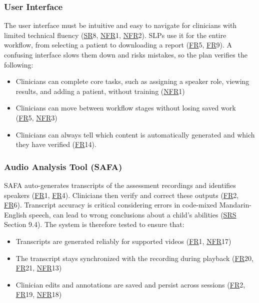 \documentclass[12pt, titlepage]{article}
\newcommand{\SRSLink}{\href{https://github.com/Nour-Fawaz/MacaBoca/blob/main/pdfs/SRS/SRS.pdf}{SRS}}
\newcommand{\srsfr}[1]{\href{https://github.com/Nour-Fawaz/MacaBoca/blob/main/pdfs/SRS/SRS.pdf}{FR}}
\newcommand{\srsnfr}[1]{\href{https://github.com/Nour-Fawaz/MacaBoca/blob/main/pdfs/SRS/SRS.pdf}{NFR}}
\newcommand{\srssr}[1]{\href{https://github.com/Nour-Fawaz/MacaBoca/blob/main/pdfs/SRS/SRS.pdf}{SR}}
\renewcommand{\_}{\oldunderscore\allowbreak}
\begin{document}
\subsubsection{User Interface}
The user interface must be intuitive and easy to navigate for clinicians with limited technical fluency (\srssr*{8}, \srsnfr*{1}, \srsnfr*{2}). 
SLPs use it for the entire workflow, from selecting a patient to downloading a report (\srsfr*{5}, \srsfr*{9}). 
A confusing interface slows them down and risks mistakes, so the plan verifies the following:
\begin{itemize}
  \item Clinicians can complete core tasks, such as assigning a speaker role, viewing results, and adding a patient, without training (\srsnfr*{1})
  \item Clinicians can move between workflow stages without losing saved work (\srsfr*{5}, \srsnfr*{3})
  \item Clinicians can always tell which content is automatically generated and which they have verified (\srsfr*{14}).
\end{itemize}

\subsubsection{Audio Analysis Tool (SAFA)}
SAFA auto-generates transcripts of the assessment recordings and identifies speakers (\srsfr*{1}, \srsfr*{4}). 
Clinicians then verify and correct these outputs (\srsfr*{2}, \srsfr*{6}). 
Transcript accuracy is critical considering errors in code-mixed Mandarin-English speech, can lead to wrong conclusions about a child’s abilities (\SRSLink{} Section 9.4). 
The system is therefore tested to ensure that:
\begin{itemize}
  \item Transcripts are generated reliably for supported videos (\srsfr*{1}, \srsnfr*{17})
  \item The transcript stays synchronized with the recording during playback (\srsfr*{20}, \srsfr*{21}, \srsnfr*{13})
  \item Clinician edits and annotations are saved and persist across sessions (\srsfr*{2}, \srsfr*{19}, \srsnfr*{18})
\end{itemize}
\end{document}
